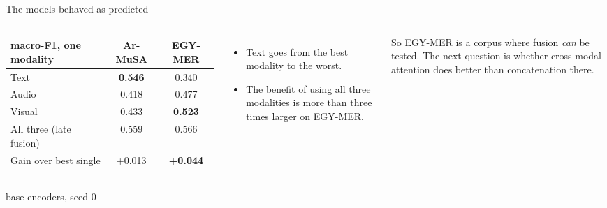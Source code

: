 \documentclass[aspectratio=169,10pt]{beamer}
\newcommand{\source}[1]{\vfill\hfill{\scriptsize\textcolor{MutedGray}{#1}}}
\begin{document}
\begin{frame}[t]{The models behaved as predicted}
\begin{columns}[T,onlytextwidth]
\centering
\begin{tabular}{@{}lcc@{}}
\toprule
macro-F1, one modality & Ar-MuSA & EGY-MER \\
\midrule
Text   & \textbf{0.546} & 0.340 \\
Audio  & 0.418 & 0.477 \\
Visual & 0.433 & \textbf{0.523} \\
\midrule
All three (late fusion) & 0.559 & 0.566 \\
Gain over best single   & +0.013 & \textbf{+0.044} \\
\bottomrule
\end{tabular}
\begin{itemize}
\item Text goes from the best modality to the worst.
\item The benefit of using all three modalities is more than three times larger on EGY-MER.
\end{itemize}
\vspace{0.3cm}
So EGY-MER is a corpus where fusion \emph{can} be tested. The next question is
whether cross-modal attention does better than concatenation there.
\end{columns}
\source{base encoders, seed 0}
\end{frame}
\end{document}
